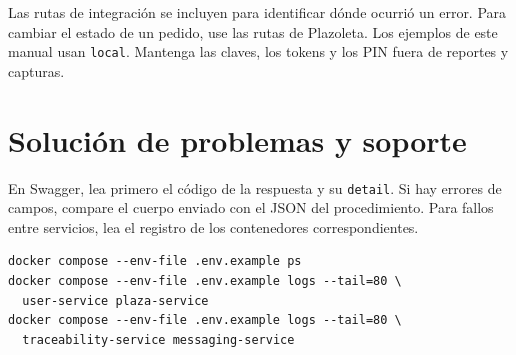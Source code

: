 \documentclass[11pt,a4paper]{article}
\newcommand{\code}[1]{\nolinkurl{#1}}
\begin{document}
Las rutas de integración se incluyen para identificar dónde ocurrió un error. Para cambiar el estado de un pedido, use las rutas de Plazoleta. Los ejemplos de este manual usan \code{local}. Mantenga las claves, los tokens y los PIN fuera de reportes y capturas.

\clearpage
\section{Solución de problemas y soporte}\label{sec:soporte}
En Swagger, lea primero el código de la respuesta y su \code{detail}. Si hay errores de campos, compare el cuerpo enviado con el JSON del procedimiento. Para fallos entre servicios, lea el registro de los contenedores correspondientes.
\begin{lstlisting}
docker compose --env-file .env.example ps
docker compose --env-file .env.example logs --tail=80 \
  user-service plaza-service
docker compose --env-file .env.example logs --tail=80 \
  traceability-service messaging-service
\end{lstlisting}
\end{document}
